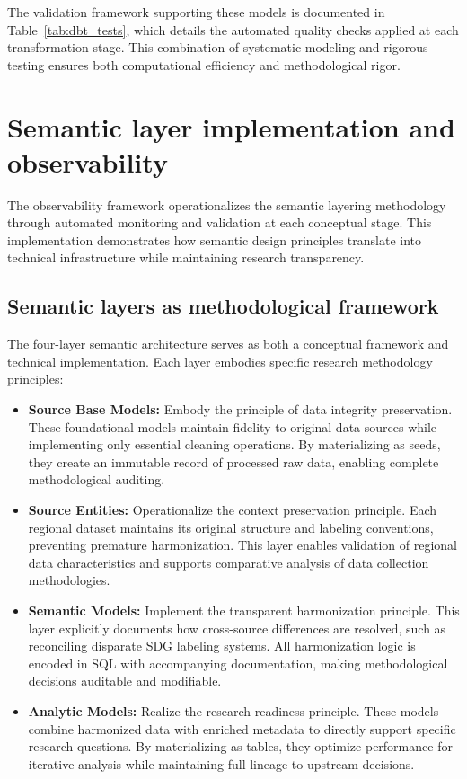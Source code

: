 \documentclass{article}
\begin{document}
The validation framework supporting these models is documented in Table~\ref{tab:dbt_tests}, which details the automated quality checks applied at each transformation stage. This combination of systematic modeling and rigorous testing ensures both computational efficiency and methodological rigor.



\section{Semantic layer implementation and observability}
\label{sec:semantic-implementation}

The observability framework operationalizes the semantic layering methodology through automated monitoring and validation at each conceptual stage. This implementation demonstrates how semantic design principles translate into technical infrastructure while maintaining research transparency.

\subsection{Semantic layers as methodological framework}
\label{subsec:semantic-layers}

The four-layer semantic architecture serves as both a conceptual framework and technical implementation. Each layer embodies specific research methodology principles:

\begin{itemize}
    \item \textbf{Source Base Models:} Embody the principle of data integrity preservation. These foundational models maintain fidelity to original data sources while implementing only essential cleaning operations. By materializing as seeds, they create an immutable record of processed raw data, enabling complete methodological auditing.

    \item \textbf{Source Entities:} Operationalize the context preservation principle. Each regional dataset maintains its original structure and labeling conventions, preventing premature harmonization. This layer enables validation of regional data characteristics and supports comparative analysis of data collection methodologies.
    
    \item \textbf{Semantic Models:} Implement the transparent harmonization principle. This layer explicitly documents how cross-source differences are resolved, such as reconciling disparate SDG labeling systems. All harmonization logic is encoded in SQL with accompanying documentation, making methodological decisions auditable and modifiable.
    
    \item \textbf{Analytic Models:} Realize the research-readiness principle. These models combine harmonized data with enriched metadata to directly support specific research questions. By materializing as tables, they optimize performance for iterative analysis while maintaining full lineage to upstream decisions.
\end{itemize}
\end{document}
